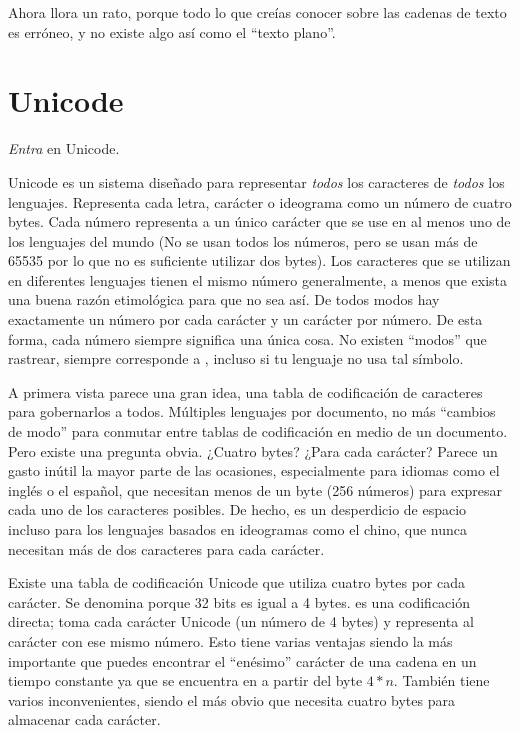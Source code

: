 Ahora llora un rato, porque todo lo que creías conocer sobre las cadenas de texto es erróneo, y no existe algo así como el ``texto plano''.

\section{Unicode}

\emph{Entra} en Unicode.

Unicode es un sistema diseñado para representar \emph{todos} los caracteres de \emph{todos} los lenguajes. Representa cada letra, carácter o ideograma como un número de cuatro bytes. Cada número representa a un único carácter que se use en al menos uno de los lenguajes del mundo (No se usan todos los números, pero se usan más de 65535 por lo que no es suficiente utilizar dos bytes). Los caracteres que se utilizan en diferentes lenguajes tienen el mismo número generalmente, a menos que exista una buena razón etimológica para que no sea así. De todos modos hay exactamente un número por cada carácter y un carácter por número. De esta forma, cada número siempre significa una única cosa. No existen ``modos'' que rastrear,  siempre corresponde a , incluso si tu lenguaje no usa tal símbolo.

A primera vista parece una gran idea, una tabla de codificación de caracteres para gobernarlos a todos. Múltiples lenguajes por documento, no más ``cambios de modo'' para conmutar entre tablas de codificación en medio de un documento. Pero existe una pregunta obvia. ¿Cuatro bytes? ¿Para cada carácter? Parece un gasto inútil la mayor parte de las ocasiones, especialmente para idiomas como el inglés o el español, que necesitan menos de un byte (256 números) para expresar cada uno de los caracteres posibles. De hecho, es un desperdicio de espacio incluso para los lenguajes basados en ideogramas como el chino, que nunca necesitan más de dos caracteres para cada carácter.

Existe una tabla de codificación Unicode que utiliza cuatro bytes por cada carácter. Se denomina  porque 32 bits es igual a 4 bytes.  es una codificación directa; toma cada carácter Unicode (un número de 4 bytes) y representa al carácter con ese mismo número. Esto tiene varias ventajas siendo la más importante que puedes encontrar el ``enésimo'' carácter de una cadena en un tiempo constante ya que se encuentra en a partir del byte $4 * n$. También tiene varios inconvenientes, siendo el más obvio que necesita cuatro bytes para almacenar cada carácter.

